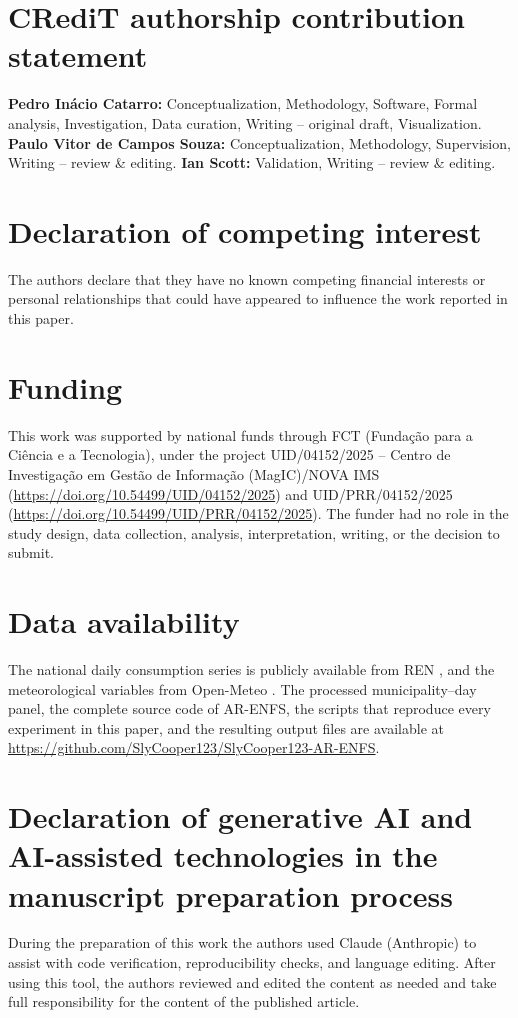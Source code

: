 \documentclass[preprint,12pt]{elsarticle}
\begin{document}
\section*{CRediT authorship contribution statement}
\textbf{Pedro In\'acio Catarro:} Conceptualization, Methodology, Software, Formal analysis, Investigation, Data curation, Writing -- original draft, Visualization. \textbf{Paulo Vitor de Campos Souza:} Conceptualization, Methodology, Supervision, Writing -- review \& editing. \textbf{Ian Scott:} Validation, Writing -- review \& editing.

\section*{Declaration of competing interest}
The authors declare that they have no known competing financial interests or personal relationships that could have appeared to influence the work reported in this paper.

\section*{Funding}
This work was supported by national funds through FCT (Funda\c{c}\~ao para a Ci\^encia e a Tecnologia), under the project UID/04152/2025 -- Centro de Investiga\c{c}\~ao em Gest\~ao de Informa\c{c}\~ao (MagIC)/NOVA IMS (\url{https://doi.org/10.54499/UID/04152/2025}) and UID/PRR/04152/2025 (\url{https://doi.org/10.54499/UID/PRR/04152/2025}). The funder had no role in the study design, data collection, analysis, interpretation, writing, or the decision to submit.

\section*{Data availability}
The national daily consumption series is publicly available from REN \citep{ren2026daily}, and the meteorological variables from Open-Meteo \citep{openmeteo2023}. The processed municipality--day panel, the complete source code of AR-ENFS, the scripts that reproduce every experiment in this paper, and the resulting output files are available at \url{https://github.com/SlyCooper123/SlyCooper123-AR-ENFS}.

\section*{Declaration of generative AI and AI-assisted technologies in the manuscript preparation process}
During the preparation of this work the authors used Claude (Anthropic) to assist with code verification, reproducibility checks, and language editing. After using this tool, the authors reviewed and edited the content as needed and take full responsibility for the content of the published article.



\end{document}
